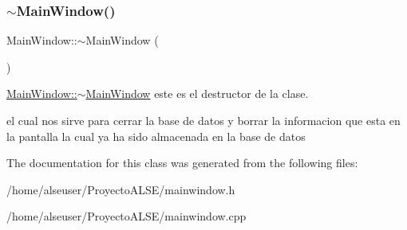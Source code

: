 \subsubsection{\texorpdfstring{$\sim$\+Main\+Window()}{~MainWindow()}}
{\footnotesize\ttfamily Main\+Window\+::$\sim$\+Main\+Window (\begin{DoxyParamCaption}{ }\end{DoxyParamCaption})}



\hyperlink{class_main_window_ae98d00a93bc118200eeef9f9bba1dba7}{Main\+Window\+::$\sim$\+Main\+Window} este es el destructor de la clase. 

el cual nos sirve para cerrar la base de datos y borrar la informacion que esta en la pantalla la cual ya ha sido almacenada en la base de datos 

The documentation for this class was generated from the following files\+:\begin{DoxyCompactItemize}
\item 
/home/alseuser/\+Proyecto\+A\+L\+S\+E/mainwindow.\+h\item 
/home/alseuser/\+Proyecto\+A\+L\+S\+E/mainwindow.\+cpp\end{DoxyCompactItemize}
